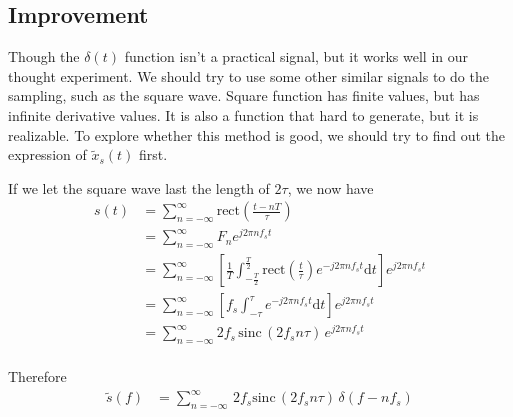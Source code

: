 \documentclass{article}
\begin{document}
\subsection{Improvement}

Though the $\delta (t)$ function isn't a practical signal, but it works well in our thought experiment. We should try to
use some other similar signals to do the sampling, such as the square wave. Square function has finite values, but has
infinite derivative values. It is also a function that hard to generate, but it is realizable. To explore whether this
method is good, we should try to find out the expression of $\widetilde{x}_s(t)$ first.

If we let the square wave last the length of $2\tau$, we now have
\begin{equation}
    \begin{aligned} s(t) & = \sum_{n = -\infty}^{\infty} \mathrm{rect} (\frac{t - nT}
     {\tau})                                    \\
             & = \sum_{n =-\infty}^{\infty}F_n e^{j2 \pi n f_s t}  \\
             & = \sum_{n = -\infty}^{\infty}\left[ \frac{1}{T} \int_{-\frac T2}^{\frac T2} \mathrm{rect}(\frac{t}
               {\tau}) e^{-j2 \pi n f_s t} \mathrm{d}t \right] e^{j2 \pi n f_s t} \\
             & = \sum_{n = -\infty}^{\infty}\left[ f_s \int_{-\tau}^{\tau} e^{-j2 \pi n f_s t} \mathrm{d}t \right] e^
               {j2 \pi n f_s t}  \\
             & = \sum_{n = -\infty}^{\infty}2f_s\, \mathrm{sinc} \,( 2f_s n\tau)\, e^{j2 \pi n f_s t} \label
               {rect_st}           \\
    \end{aligned}
\end{equation}

Therefore
\begin{equation}
    \begin{aligned}
        \widetilde{s}(f) & = \sum_{n = -\infty}^{\infty}\, 2f_s \mathrm{sinc}\, ( 2f_s n\tau)\, \delta(f - nf_s) \\
    \end{aligned}
\end{equation}
\end{document}
